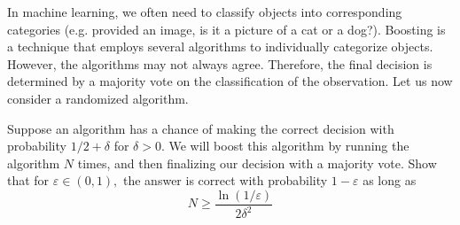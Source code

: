 \begin{tcolorbox}
    \begin{example}
    In machine learning, we often need to classify objects into corresponding categories (e.g. provided an image, is it a picture of a cat or a dog?). Boosting is a technique that employs several algorithms to individually categorize objects. However, the algorithms may not always agree. Therefore, the final decision is determined by a majority vote on the classification of the observation. Let us now consider a randomized algorithm. 
    
    Suppose an algorithm has a chance of making the correct decision with probability $1/2 + \delta$ for $\delta>0$. We will boost this algorithm by running the algorithm $N$ times, and then finalizing our decision with a majority vote. Show that for $\varepsilon \in (0,1),$ the answer is correct with probability $1-\varepsilon$ as long as 
    $$ N \geq \frac{\ln{(1/\varepsilon)}}{2\delta^2} $$
    \end{example}
\end{tcolorbox}
